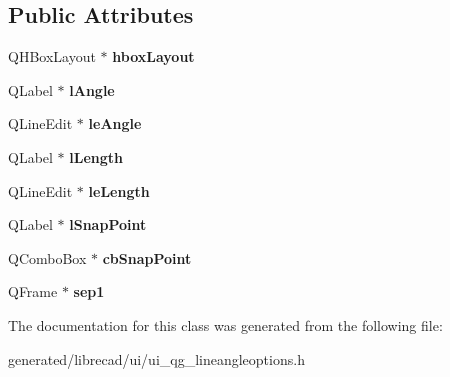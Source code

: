 \subsection*{Public Attributes}
\begin{DoxyCompactItemize}
\item 
\hypertarget{classUi__QG__LineAngleOptions_aa222080b8f0e3c75e99b758aac1f107e}{Q\-H\-Box\-Layout $\ast$ {\bfseries hbox\-Layout}}\label{classUi__QG__LineAngleOptions_aa222080b8f0e3c75e99b758aac1f107e}

\item 
\hypertarget{classUi__QG__LineAngleOptions_a3b5124be66776edf4234971349c0521c}{Q\-Label $\ast$ {\bfseries l\-Angle}}\label{classUi__QG__LineAngleOptions_a3b5124be66776edf4234971349c0521c}

\item 
\hypertarget{classUi__QG__LineAngleOptions_ae70a83113b44c716d73061d1b758a1c6}{Q\-Line\-Edit $\ast$ {\bfseries le\-Angle}}\label{classUi__QG__LineAngleOptions_ae70a83113b44c716d73061d1b758a1c6}

\item 
\hypertarget{classUi__QG__LineAngleOptions_ab64dfad782a219cc053498a54da7c8b6}{Q\-Label $\ast$ {\bfseries l\-Length}}\label{classUi__QG__LineAngleOptions_ab64dfad782a219cc053498a54da7c8b6}

\item 
\hypertarget{classUi__QG__LineAngleOptions_ae7ce136940eba83746fb1e23221a02f6}{Q\-Line\-Edit $\ast$ {\bfseries le\-Length}}\label{classUi__QG__LineAngleOptions_ae7ce136940eba83746fb1e23221a02f6}

\item 
\hypertarget{classUi__QG__LineAngleOptions_a0f9de4e24ec7de8cb8f18545cabe7f75}{Q\-Label $\ast$ {\bfseries l\-Snap\-Point}}\label{classUi__QG__LineAngleOptions_a0f9de4e24ec7de8cb8f18545cabe7f75}

\item 
\hypertarget{classUi__QG__LineAngleOptions_a5acfe1b5e9b1fe54dd4579d64b7bbd4b}{Q\-Combo\-Box $\ast$ {\bfseries cb\-Snap\-Point}}\label{classUi__QG__LineAngleOptions_a5acfe1b5e9b1fe54dd4579d64b7bbd4b}

\item 
\hypertarget{classUi__QG__LineAngleOptions_aeb5ebf2d260922f97a6b8c51bb508644}{Q\-Frame $\ast$ {\bfseries sep1}}\label{classUi__QG__LineAngleOptions_aeb5ebf2d260922f97a6b8c51bb508644}

\end{DoxyCompactItemize}


The documentation for this class was generated from the following file\-:\begin{DoxyCompactItemize}
\item 
generated/librecad/ui/ui\-\_\-qg\-\_\-lineangleoptions.\-h\end{DoxyCompactItemize}
